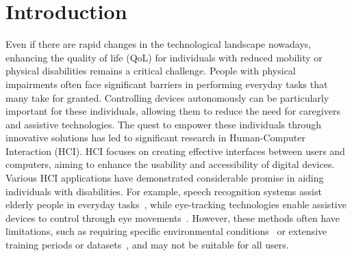\chapter{Introduction}\label{ch:introduction}



Even if there are rapid changes in the technological landscape nowadays, enhancing the quality of life (QoL) for individuals with reduced mobility or physical disabilities remains a critical challenge. 
People with physical impairments often face significant barriers in performing everyday tasks that many take for granted. 
Controlling devices autonomously can be particularly important for these individuals, allowing them to reduce the need for caregivers and assistive technologies.
The quest to empower these individuals through innovative solutions has led to significant research in Human-Computer Interaction (HCI).
HCI focuses on creating effective interfaces between users and computers, aiming to enhance the usability and accessibility of digital devices. 
Various HCI applications have demonstrated considerable promise in aiding individuals with disabilities. 
For example, speech recognition systems assist elderly people in everyday tasks~\cite{10444265}, while eye-tracking technologies enable assistive devices to control through eye movements~\cite{10560196}. 
However, these methods often have limitations, such as requiring specific environmental conditions~\cite{khazaleh2024investigation} or extensive training periods or datasets~\cite{ke2024using}, and may not be suitable for all users.

